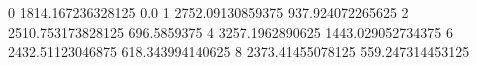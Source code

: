 0 1814.167236328125 0.0
1 2752.09130859375 937.924072265625
2 2510.753173828125 696.5859375
4 3257.1962890625 1443.029052734375
6 2432.51123046875 618.343994140625
8 2373.41455078125 559.247314453125
